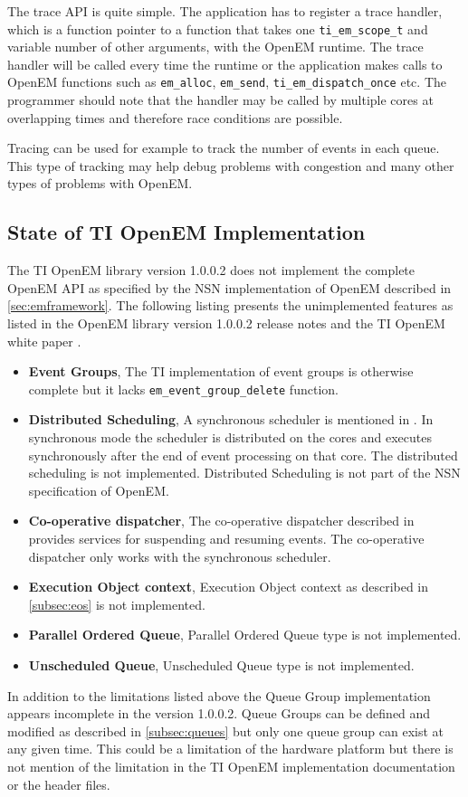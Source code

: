 The trace API is quite simple. The application has to register a trace handler,
which is a function pointer to a function that takes one
\texttt{ti\_em\_scope\_t} and variable number of other arguments, with the
OpenEM runtime. The trace handler will be called every time the runtime or the
application makes calls to OpenEM functions such as \texttt{em\_alloc},
\texttt{em\_send}, \texttt{ti\_em\_dispatch\_once} etc. \cite{openemapi} The
programmer should note that the handler may be called by multiple cores at
overlapping times and therefore race conditions are possible.

Tracing can be used for example to track the number of events in each queue.
This type of tracking may help debug problems with congestion and many other
types of problems with OpenEM.

\subsection{State of TI OpenEM Implementation}
The TI OpenEM library version 1.0.0.2 does not implement the complete OpenEM API
as specified by the NSN implementation of OpenEM described in
\ref{sec:emframework}. The following listing presents the unimplemented features
as listed in the OpenEM library version 1.0.0.2 release notes
\cite{openemnotes} and the TI OpenEM white paper \cite{openemwhite}.

\begin{itemize}
    \item \textbf{Event Groups},
        The TI implementation of event groups is otherwise complete but it lacks
        \texttt{em\_event\_group\_delete} function.
    \item \textbf{Distributed Scheduling},
        A synchronous scheduler is mentioned in \cite{openemwhite}. In
        synchronous mode the scheduler is distributed on the cores and executes
        synchronously after the end of event processing on that core. The
        distributed scheduling is not implemented. Distributed Scheduling is not
        part of the NSN specification of OpenEM.
    \item \textbf{Co-operative dispatcher},
        The co-operative dispatcher described in \cite{openemwhite} provides
        services for suspending and resuming events. The co-operative dispatcher
        only works with the synchronous scheduler.
    \item \textbf{Execution Object context},
        Execution Object context as described in \ref{subsec:eos} is not
        implemented.
    \item \textbf{Parallel Ordered Queue},
        Parallel Ordered Queue type is not implemented.
    \item \textbf{Unscheduled Queue},
        Unscheduled Queue type is not implemented.
\end{itemize}

In addition to the limitations listed above the Queue Group implementation
appears incomplete in the version 1.0.0.2. Queue Groups can be defined and
modified as described in \ref{subsec:queues} but only one queue group can exist
at any given time. This could be a limitation of the hardware platform but there
is not mention of the limitation in the TI OpenEM implementation documentation
or the header files.
